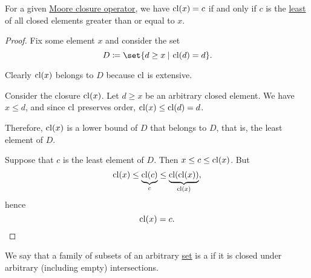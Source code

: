 \begin{proposition}\label{thm:closure_operator_minimality}
  For a given \hyperref[def:moore_closure_operator]{Moore closure operator}, we have \( \operatorname{cl}(x) = c \) if and only if \( c \) is the \hyperref[def:extremal_points/greatest_and_least]{least} of all closed elements greater than or equal to \( x \).
\end{proposition}
\begin{proof}
  Fix some element \( x \) and consider the set
  \begin{equation*}
    D \coloneqq \set{ d \geq x \given \cl(d) = d }.
  \end{equation*}

  Clearly \( \operatorname{cl}(x) \) belongs to \( D \) because \( \operatorname{cl} \) is extensive.

  \SufficiencySubProof Consider the closure \( \operatorname{cl}(x) \). Let \( d \geq x \) be an arbitrary closed element. We have \( x \leq d \), and since \( \operatorname{cl} \) preserves order, \( \operatorname{cl}(x) \leq \operatorname{cl}(d) = d \).

  Therefore, \( \operatorname{cl}(x) \) is a lower bound of \( D \) that belongs to \( D \), that is, the least element of \( D \).

  \NecessitySubProof Suppose that \( c \) is the least element of \( D \). Then \( x \leq c \leq \operatorname{cl}(x) \). But
  \begin{equation*}
    \operatorname{cl}(x) \leq \underbrace{\operatorname{cl}(c)}_{c} \leq \underbrace{\operatorname{cl}(\operatorname{cl}(x))}_{\operatorname{cl}(x)},
  \end{equation*}
  hence
  \begin{equation*}
    \operatorname{cl}(x) = c.
  \end{equation*}
\end{proof}

\begin{definition}\label{def:moore_family}
  We say that a family of subsets of an arbitrary \hyperref[def:set]{set} is a  if it is closed under arbitrary (including empty) intersections.
\end{definition}

